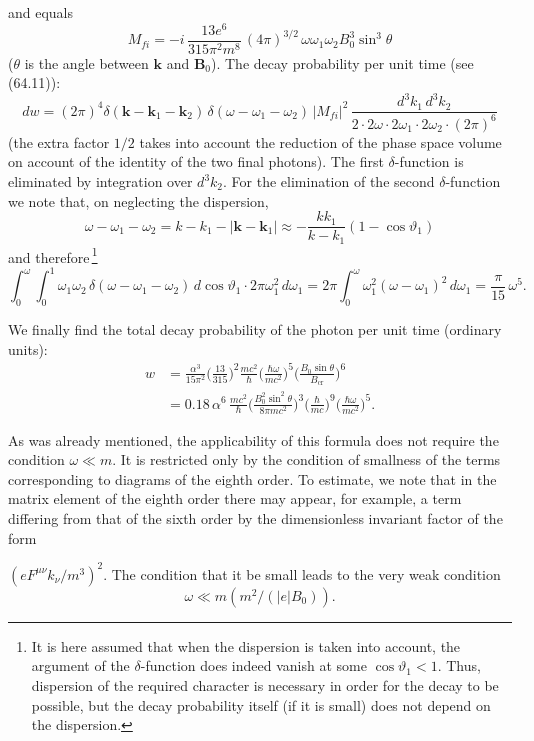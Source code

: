 \noindent and equals
\[
M_{fi} = -i\,\frac{13e^6}{315\pi^2 m^8}\,(4\pi)^{3/2}\,\omega\omega_1\omega_2 B_0^3\sin^3\theta
\]
($\theta$ is the angle between $\mathbf{k}$ and $\mathbf{B}_0$). The decay probability per unit time (see (64.11)):
\[
dw = (2\pi)^4\delta(\mathbf{k} - \mathbf{k}_1 - \mathbf{k}_2)\,\delta(\omega - \omega_1 - \omega_2)\,|M_{fi}|^2\,\frac{d^3k_1\,d^3k_2}{2\cdot 2\omega\cdot 2\omega_1\cdot 2\omega_2\cdot(2\pi)^6}
\]
(the extra factor $1/2$ takes into account the reduction of the phase space volume on account of the identity of the two final photons). The first $\delta$-function is eliminated by integration over $d^3k_2$. For the elimination of the second $\delta$-function we note that, on neglecting the dispersion,
\[
\omega - \omega_1 - \omega_2 = k - k_1 - |\mathbf{k} - \mathbf{k}_1| \approx -\frac{kk_1}{k - k_1}(1 - \cos\vartheta_1)
\]
and therefore\,\footnote{It is here assumed that when the dispersion is taken into account, the argument of the $\delta$-function does indeed vanish at some $\cos\vartheta_1 < 1$. Thus, dispersion of the required character is necessary in order for the decay to be possible, but the decay probability itself (if it is small) does not depend on the dispersion.}
\[
\int_0^\omega\!\!\int_0^1 \omega_1\omega_2\,\delta(\omega - \omega_1 - \omega_2)\,d\cos\vartheta_1\cdot 2\pi\omega_1^2\,d\omega_1 = 2\pi\!\int_0^\omega\omega_1^2(\omega - \omega_1)^2\,d\omega_1 = \frac{\pi}{15}\,\omega^5.
\]

We finally find the total decay probability of the photon per unit time (ordinary units):
\begin{equation}
\begin{split}
w &= \frac{\alpha^3}{15\pi^2}\biggl(\frac{13}{315}\biggr)^{\!2}\frac{mc^2}{\hbar}\biggl(\frac{\hbar\omega}{mc^2}\biggr)^{\!5}\biggl(\frac{B_0\sin\theta}{B_{\text{cr}}}\biggr)^{\!6}\\[6pt]
&= 0.18\,\alpha^6\,\frac{mc^2}{\hbar}\biggl(\frac{B_0^2\sin^2\theta}{8\pi mc^2}\biggr)^{\!3}\biggl(\frac{\hbar}{mc}\biggr)^{\!9}\biggl(\frac{\hbar\omega}{mc^2}\biggr)^{\!5}.
\end{split}
\label{eq:130.19}
\end{equation}

As was already mentioned, the applicability of this formula does not require the condition $\omega \ll m$. It is restricted only by the condition of smallness of the terms corresponding to diagrams of the eighth order. To estimate, we note that in the matrix element of the eighth order there may appear, for example, a term differing from that of the sixth order by the dimensionless invariant factor of the form


\noindent $(eF^{\mu\nu}k_\nu/m^3)^2$. The condition that it be small leads to the very weak condition
\[
\omega \ll m(m^2/(|e|B_0)).
\]
